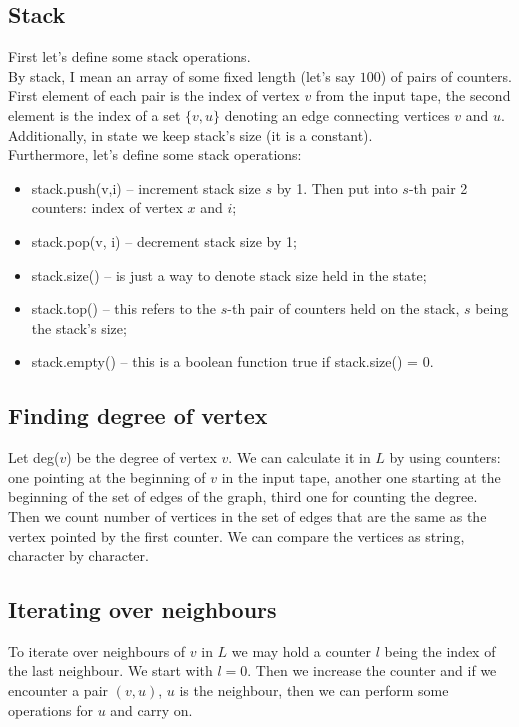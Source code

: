 \documentclass[11pt]{article}
\begin{document}
\subsection{Stack}
First let's define some stack operations.\\ By stack, I mean an array of some
fixed length (let's say $100$) of pairs of counters. First element of each pair
is the index of vertex $v$ from the input tape, the second element is the index
of a set $\{v, u\}$ denoting an edge connecting vertices $v$ and
$u$. Additionally, in state we keep stack's size (it is a constant).\\
Furthermore, let's define some stack operations:
\begin{itemize}
    \item stack.push(v,i) -- increment stack size $s$ by 1. Then put into $s$-th pair
        2 counters: index of vertex $x$ and $i$;
    \item stack.pop(v, i) -- decrement stack size by 1;
    \item stack.size() -- is just a way to denote stack size held in the state;
    \item stack.top() -- this refers to the $s$-th pair of counters held on the stack, $s$ being the stack's size;
    \item stack.empty() -- this is a boolean function true if stack.size() = $0$.
\end{itemize}

\subsection{Finding degree of vertex}
Let deg($v$) be the degree of vertex $v$. We can calculate it in $L$ by using
counters: one pointing at the beginning of $v$ in the input tape, another one
starting at the beginning of the set of edges of the graph, third one for
counting the degree. Then we count number of vertices in the set of edges that
are the same as the vertex pointed by the first counter. We can compare the
vertices as string, character by character.

\subsection{Iterating over neighbours}
To iterate over neighbours of $v$ in $L$ we may hold a counter $l$ being the
index of the last neighbour. We start with $l = 0$. Then we increase the counter
and if we encounter a pair $(v,u)$, $u$ is the neighbour, then we can perform
some operations for $u$ and carry on.
\end{document}
